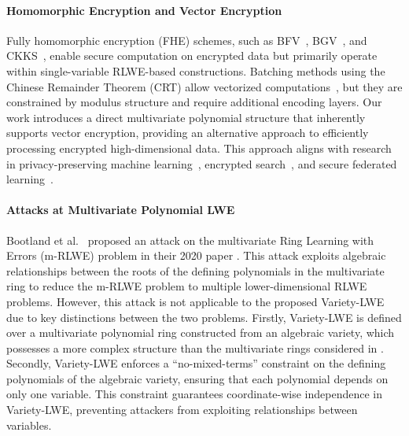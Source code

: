 \paragraph{Homomorphic Encryption and Vector Encryption}  
Fully homomorphic encryption (FHE) schemes, such as BFV~\cite{bfv}, BGV~\cite{Brakerski2014}, and CKKS~\cite{ckks}, enable secure computation on encrypted data but primarily operate within single-variable RLWE-based constructions. Batching methods using the Chinese Remainder Theorem (CRT) allow vectorized computations~\cite{GentryHaleviSmart2012,Chillotti2020tfhe}, but they are constrained by modulus structure and require additional encoding layers. Our work introduces a direct multivariate polynomial structure that inherently supports vector encryption, providing an alternative approach to efficiently processing encrypted high-dimensional data. This approach aligns with research in privacy-preserving machine learning~\cite{Dowlin2017cryptonets}, encrypted search~\cite{danb_crypto04}, and secure federated learning~\cite{Phong2017}. 


\paragraph{Attacks at Multivariate Polynomial LWE}
Bootland et al.~\cite{cbootland_ants20} proposed an attack on the multivariate Ring Learning with Errors (m-RLWE) problem in their 2020 paper \cite{cbootland_ants20}. This attack exploits algebraic relationships between the roots of the defining polynomials in the multivariate ring to reduce the m-RLWE problem to multiple lower-dimensional RLWE problems. However, this attack is not applicable to the proposed Variety-LWE due to key distinctions between the two problems.
Firstly, Variety-LWE is defined over a multivariate polynomial ring constructed from an algebraic variety, which possesses a more complex structure than the multivariate rings considered in \cite{cbootland_ants20}. Secondly, Variety-LWE enforces a ``no-mixed-terms'' constraint on the defining polynomials of the algebraic variety, ensuring that each polynomial depends on only one variable. This constraint guarantees coordinate-wise independence in Variety-LWE, preventing attackers from exploiting relationships between variables.